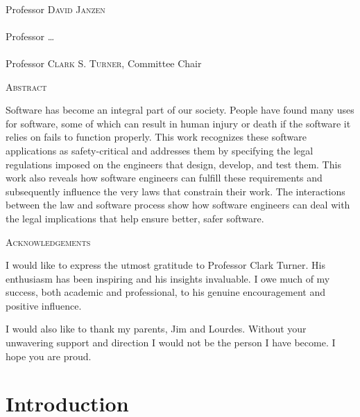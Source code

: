 \documentclass[12pt]{report}
\newcommand{\committeechair}{\textsc{Clark S. Turner}}
\newcommand{\committeeA}{\textsc{David Janzen}}
\newcommand{\committeeB}{\textsc{\ldots}}
\begin{document}
\singlespace  
\noindent\makebox[4in]{\hrulefill}\\  
Professor \committeeA\\[2cm]  

\noindent\makebox[4in]{\hrulefill}\\  
Professor \committeeB\\[2cm]  

\noindent\makebox[4in]{\hrulefill}\\  
Professor \committeechair, Committee Chair\\[4cm]  

\doublespace  

\newpage  

\begin{center}\textsc{\large Abstract}\\[1cm]\end{center}  
Software has become an integral part of our society. People have found many uses for software, some of which can result in human injury or death if the software it relies on fails to function properly. This work recognizes these software applications as safety-critical and addresses them by specifying the legal regulations imposed on the engineers that design, develop, and test them. This work also reveals how software engineers can fulfill these requirements and subsequently influence the very laws that constrain their work. The interactions between the law and software process show how software engineers can deal with the legal implications that help ensure better, safer software.  
\newpage  

\begin{center}\textsc{\large Acknowledgements}\\[1cm]\end{center}  
I would like to express the utmost gratitude to Professor Clark Turner. His enthusiasm has been inspiring and his insights invaluable. I owe much of my success, both academic and professional, to his genuine encouragement and positive influence.  


I would also like to thank my parents, Jim and Lourdes. Without your unwavering support and direction I would not be the person I have become. I hope you are proud.  

\tableofcontents  
\listoffigures{}  


\chapter{Introduction}  
\end{document}

